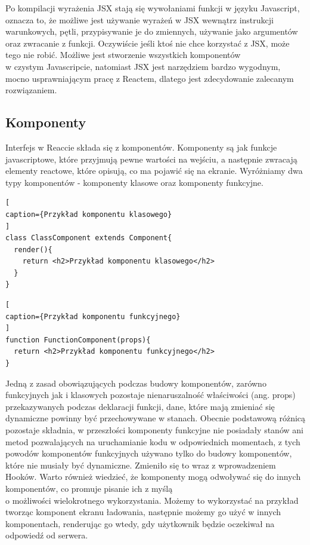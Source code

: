 \documentclass[oneside,polski,logo,indent]{amuthesis}
\begin{document}
{Po kompilacji wyrażenia JSX stają się wywołaniami funkcji w języku Javascript, oznacza to, że możliwe jest używanie wyrażeń w JSX wewnątrz instrukcji warunkowych, pętli, przypisywanie je do zmiennych, używanie jako argumentów oraz zwracanie z funkcji.
Oczywiście jeśli ktoś nie chce korzystać z JSX, może tego nie robić. Możliwe jest stworzenie wszystkich komponentów \\w czystym Javascripcie, natomiast JSX jest narzędziem bardzo wygodnym, mocno usprawniającym pracę z Reactem, dlatego jest zdecydowanie zalecanym rozwiązaniem.

}

\subsection{Komponenty}
{
Interfejs w Reaccie składa się z komponentów. Komponenty są jak funkcje javascriptowe, które przyjmują pewne wartości na wejściu, a następnie zwracają elementy reactowe, które opisują, co ma pojawić się na ekranie.
Wyróżniamy dwa typy komponentów - komponenty klasowe oraz komponenty funkcyjne.


\begin{lstlisting}[
caption={Przykład komponentu klasowego}
]
class ClassComponent extends Component{
  render(){
    return <h2>Przykład komponentu klasowego</h2>
  }
}

\end{lstlisting}


\begin{lstlisting}[
caption={Przykład komponentu funkcyjnego}
]
function FunctionComponent(props){
  return <h2>Przykład komponentu funkcyjnego</h2>
}

\end{lstlisting}

Jedną z zasad obowiązujących podczas budowy komponentów, zarówno funkcyjnych jak i klasowych pozostaje nienaruszalność właściwości (ang. props) przekazywanych podczas deklaracji funkcji, dane, które mają zmieniać się dynamiczne powinny być przechowywane w stanach.
Obecnie podstawową różnicą pozostaje składnia, w przeszłości komponenty funkcyjne nie posiadały stanów ani metod pozwalających na uruchamianie kodu w odpowiednich momentach, z tych powodów komponentów funkcyjnych używano tylko do budowy komponentów, które nie musiały być dynamiczne. Zmieniło się to wraz z wprowadzeniem Hooków.
Warto również wiedzieć, że komponenty mogą odwoływać się do innych komponentów, co promuje pisanie ich z myślą \\o możliwości wielokrotnego wykorzystania. Możemy to wykorzystać na przykład tworząc komponent ekranu ładowania, następnie możemy go użyć w innych komponentach, renderując go wtedy, gdy użytkownik będzie oczekiwał na odpowiedź od serwera.



}
\end{document}
